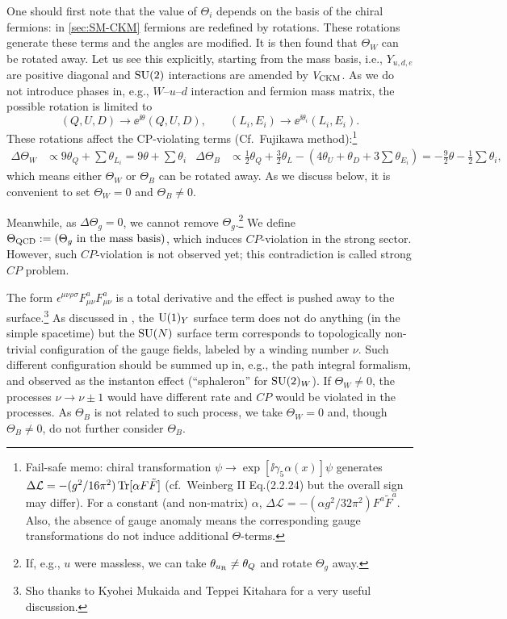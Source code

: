 \documentclass[CheatSheet]{subfiles}
\begin{document}
One should first note that the value of $\Theta_i$ depends on the basis of the chiral fermions: in \cref{sec:SM-CKM} fermions are redefined by rotations. These rotations generate these terms and the angles are modified.
It is then found that $\Theta_W$ can be rotated away.
Let us see this explicitly, starting from the mass basis, i.e., $Y_{u,d,e}$ are positive diagonal and $\operatorname{\mathrm SU}(2)$ interactions are amended by $V_{\mathrm{CKM}}$.
As we do not introduce phases in, e.g., $W$--$u$--$d$ interaction and fermion mass matrix, the possible rotation is limited to
\begin{equation}
 (Q,U,D)\to\ee^{\ii\theta}(Q,U,D), \qquad
 (L_i, E_i)\to\ee^{\ii\theta_i}(L_i,E_i).
\end{equation}
These rotations affect the CP-violating terms (Cf.~Fujikawa method):\footnote{%
Fail-safe memo:
chiral transformation $\psi\to\exp[\ii\gamma_5\alpha(x)]\psi$ generates
$\Delta\mathcal L = -(g^2/16\pi^2)\operatorname{\mathrm{Tr}}[\alpha F\tilde F]$ (cf.~Weinberg II Eq.(2.2.24) but the overall sign may differ). For a constant (and non-matrix) $\alpha$, 
$\Delta\mathcal L = -(\alpha g^2/32\pi^2)F^a\tilde F^a$.
Also, the absence of gauge anomaly means the corresponding gauge transformations do not induce additional $\Theta$-terms.
}
\begin{align}
 \Delta \Theta_W &\propto 9\theta_Q + \sum\theta_{L_i} = 9\theta + \sum\theta_i&
 \Delta \Theta_B &\propto \frac12 \theta_Q + \frac32 \theta_L - (4\theta_U+\theta_D+3\sum\theta_{E_i}) = -\frac92 \theta - \frac12 \sum\theta_i,
\end{align}
which means either $\Theta_W$ or $\Theta_B$ can be rotated away.
As we discuss below, it is convenient to set $\Theta_W=0$ and $\Theta_B\neq 0$.

Meanwhile, as $\Delta\Theta_g=0$, we cannot remove $\Theta_g$.\footnote{If, e.g., $u$ were massless, we can take $\theta_{u_{\mathrm{R}}}\neq\theta_Q$ and rotate $\Theta_g$ away.}
We define $\Theta_{\mathrm{QCD}}:=(\text{$\Theta_g$ in the mass basis})$, which induces $CP$-violation in the strong sector.
However, such $CP$-violation is not observed yet; this contradiction is called strong $CP$ problem.

The form $\epsilon^{\mu\nu\rho\sigma}F^a_{\mu\nu}F^a_{\mu\nu}$ is a total derivative and the effect is pushed away to the surface.\footnote{%
  Sho thanks to Kyohei Mukaida and Teppei Kitahara for a very useful discussion.
}
As discussed in \cite[\S23]{WeinbergQFT2}, the $\operatorname{\mathrm U}(1)_Y$ surface term does not do anything (in the simple spacetime) but the $\operatorname{\mathrm SU}(N)$ surface term corresponds to topologically non-trivial configuration of the gauge fields, labeled by a winding number $\nu$.
Such different configuration should be summed up in, e.g., the path integral formalism, and observed as the instanton effect (``sphaleron'' for $\operatorname{\mathrm SU}(2)_W$).
If $\Theta_W\neq 0$, the processes $\nu\to\nu\pm1$ would have different rate and $CP$ would be violated in the processes.
As $\Theta_B$ is not related to such process, we take $\Theta_W=0$ and, though $\Theta_B\neq 0$, do not further consider $\Theta_B$.
\end{document}
